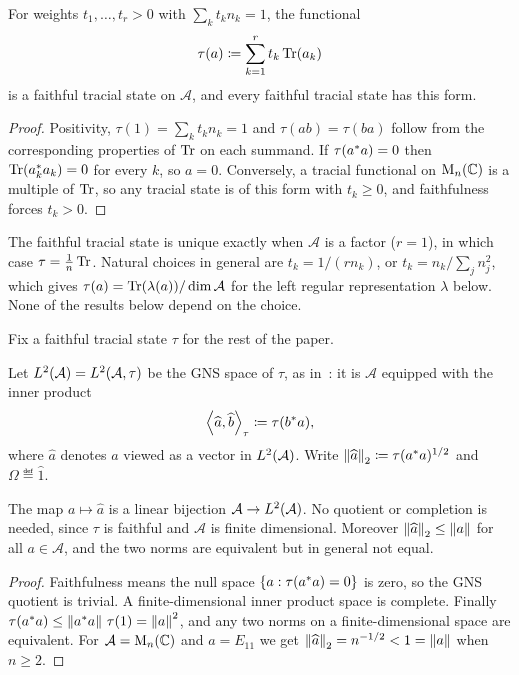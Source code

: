 \documentclass[12pt]{article}
\newcommand{\alg}{\mathcal{A}}             %
\newcommand{\ip}[2]{\left\langle #1 , #2 \right\rangle}
\newcommand{\Ltwo}{L^2\br{\alg}}           %
\newcommand{\vect}[1]{\widehat{#1}}        %
\begin{document}
\begin{lemma}
\label{lem:trace}
For weights \(t_1, \dots, t_r > 0\) with \(\sum_k t_k n_k = 1\), the functional
\[
  \tau(a) \coloneqq \sum_{k=1}^r t_k \operatorname{Tr}(a_k)
\]
is a faithful tracial state on \(\alg\), and every faithful tracial state has this
form.
\end{lemma}
\begin{proof}
Positivity, \(\tau(1) = \sum_k t_k n_k = 1\) and \(\tau(ab) = \tau(ba)\) follow
from the corresponding properties of \(\operatorname{Tr}\) on each summand. If
\(\tau(a^* a) = 0\) then \(\operatorname{Tr}(a_k^* a_k) = 0\) for every \(k\),
so \(a = 0\). Conversely, a tracial functional on \(\mathrm{M}_{n}({\mathbb C})\) is
a multiple of \(\operatorname{Tr}\), so any tracial state is of this form with
\(t_k \ge 0\), and faithfulness forces \(t_k > 0\).
\end{proof}

\begin{remark}
The faithful tracial state is unique exactly when \(\alg\) is a factor
(\(r = 1\)), in which case \(\tau = \frac{1}{n}\operatorname{Tr}\). Natural choices in general
are \(t_k = 1/(r n_k)\), or \(t_k = n_k / \sum_j n_j^2\), which gives
\(\tau(a) = \trace(\lambda(a)) / \dim \alg\) for the left regular representation
\(\lambda\) below. None of the results below depend on the choice.
\end{remark}

Fix a faithful tracial state \(\tau\) for the rest of the paper.

\begin{definition}[The space \(\Ltwo\)]
\label{def:ltwo}
Let \(\Ltwo = L^2(\alg, \tau)\) be the GNS space of \(\tau\), as
in~\cite{AnantharamanPopa}: it is \(\alg\) equipped with the inner product
\[
  \ip{\vect{a}}{\vect{b}}_{\tau} \eqdef \tau(b^\adjoint a),
\]
where \(\vect{a}\) denotes \(a\) viewed as a vector in \(\Ltwo\). Write
\(\norm{\vect{a}}_2 \eqdef \tau(a^\adjoint a)^{1/2}\) and
\(\Omega \eqdef \vect{1}\).
\end{definition}

\begin{lemma}
\label{lem:ltwo}
The map \(a \mapsto \vect{a}\) is a linear bijection \(\alg \to \Ltwo\). No quotient
or completion is needed, since \(\tau\) is faithful and \(\alg\) is finite
dimensional. Moreover
\(\norm{\vect{a}}_2 \le \norm{a}\) for all \(a \in \alg\), and the two norms are
equivalent but in general not equal.
\end{lemma}
\begin{proof}
Faithfulness means the null space \(\left\{ a : \tau(a^* a) = 0 \right\}\) is zero, so
the GNS quotient is trivial. A finite-dimensional inner product space is
complete. Finally \(\tau(a^* a) \le \left\| a^* a \right\|\,\tau(1) =
\left\| a \right\|^2\), and any two norms on a finite-dimensional space are equivalent.
For \(\alg = \mathrm{M}_n(\complex)\) and \(a = E_{11}\) we get
\(\norm{\vect{a}}_2 = n^{-1/2} < 1 = \norm{a}\) when \(n \ge 2\).
\end{proof}
\end{document}
